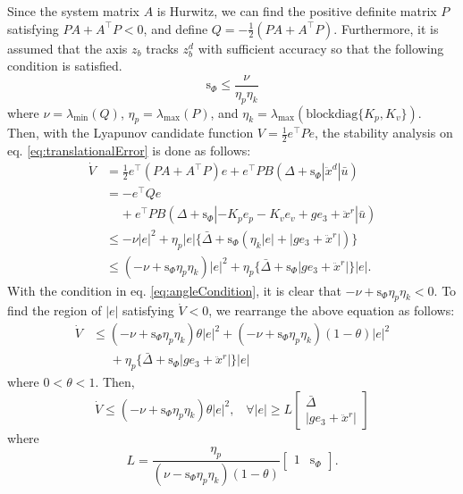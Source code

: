 \documentclass[letterpaper, 10 pt, conference]{ieeeconf}  %
\begin{document}
Since the system matrix $A$ is Hurwitz, we can find the positive definite matrix $P$ satisfying $PA + A^\intercal P < 0$, and define $Q = -\frac{1}{2}(PA +A^\intercal P)$. 
Furthermore, it is assumed that the axis $z_b$ tracks $z_b^d$ with sufficient accuracy so that the following condition is satisfied.
\begin{equation}
\text{s}_\Phi \leq {\frac{\nu}{\eta_p\eta_k}} \label{eq:angleCondition}
\end{equation}
where 
$\nu = \lambda_{\min}(Q)$, $\eta_p = \lambda_{\max}(P)$, and $\eta_k = \lambda_{\max}(\text{blockdiag}\{K_p,K_v\})$.
Then, with the Lyapunov candidate function $V = \frac{1}{2}e^\intercal P e$, the stability analysis on eq. \eqref{eq:translationalError} is done as follows: 
\begin{align}
\dot{V} &= \textstyle{\frac{1}{2}}e^\intercal (PA + A^\intercal P)e + e^\intercal P B (\Delta + \text{s}_\Phi|\ddot{x}^d|\bar{u}) \nonumber \\
&= -e^\intercal Q e \label{eq:lyapForFunnel} \\
&\;\;\;\; + e^\intercal P B (\Delta + \text{s}_\Phi |-K_p e_p - K_v e_v +ge_3+{\ddot{x}}^r|\bar{u}) \nonumber  \\
&\leq -\nu |e|^2 + \eta_p|e|\{\bar{\Delta}+\text{s}_\Phi(\eta_k|e|+|ge_3 + \ddot{x}^r|)\} \nonumber \\
&\leq (-\nu + \text{s}_\Phi\eta_p\eta_k)|e|^2 + \eta_p\{\bar{\Delta} + \text{s}_\Phi|ge_3+\ddot{x}^r|\}|e|. \nonumber 
\end{align}
With the condition in eq. \eqref{eq:angleCondition}, it is clear that $-\nu+\text{s}_\Phi\eta_p\eta_k < 0$. To find the region of $|e|$ satisfying $\dot{V} < 0$, we rearrange the above equation as follows:
\begin{align}
\dot{V} &\leq (-\nu+\text{s}_\Phi\eta_p\eta_k)\theta|e|^2 + (-\nu+\text{s}_\Phi\eta_p\eta_k)(1-\theta)|e|^2 \nonumber \\
&\;\;\;\;\;+\eta_p\{\bar{\Delta} + \text{s}_\Phi |ge_3+\ddot{x}^r|\}|e| \nonumber 
\end{align}
where $0<\theta<1$. 
Then, 
\begin{equation}
\dot{V} \leq (-\nu+\text{s}_\Phi\eta_p\eta_k)\theta|e|^2,\;\;\; \forall |e| \geq L \left[\begin{array}{l}\bar{\Delta} \\ |ge_3+\ddot{x}^r|\end{array}\right] \nonumber 
\end{equation}
where
\begin{equation}
L = \frac{\eta_p}{(\nu-\text{s}_\Phi\eta_p\eta_k)(1-\theta)}[\begin{array}{cc}1 & \text{s}_\Phi \end{array}]. \nonumber
\end{equation}
\end{document}
